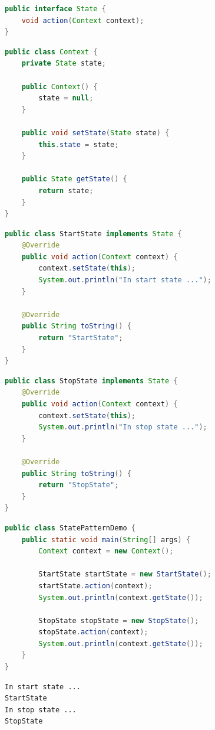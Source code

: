 \vspace{0.5cm}

\begin{lstlisting}[language=Java, title=State.java]
public interface State {
    void action(Context context);
}
\end{lstlisting}

\begin{lstlisting}[language=Java, title=Context.java]
public class Context {
    private State state;

    public Context() {
        state = null;
    }

    public void setState(State state) {
        this.state = state;
    }

    public State getState() {
        return state;
    }
}
\end{lstlisting}

\begin{lstlisting}[language=Java, title=StartState.java]
public class StartState implements State {
    @Override
    public void action(Context context) {
        context.setState(this);
        System.out.println("In start state ...");
    }

    @Override
    public String toString() {
        return "StartState";
    }
}
\end{lstlisting}

\begin{lstlisting}[language=Java, title=StopState.java]
public class StopState implements State {
    @Override
    public void action(Context context) {
        context.setState(this);
        System.out.println("In stop state ...");
    }

    @Override
    public String toString() {
        return "StopState";
    }
}
\end{lstlisting}

\begin{lstlisting}[language=Java, title=StatePatternDemo.java]
public class StatePatternDemo {
    public static void main(String[] args) {
        Context context = new Context();

        StartState startState = new StartState();
        startState.action(context);
        System.out.println(context.getState());

        StopState stopState = new StopState();
        stopState.action(context);
        System.out.println(context.getState());
    }
}
\end{lstlisting}

\begin{tcolorbox}
    \begin{verbatim}
In start state ...
StartState
In stop state ...
StopState
\end{verbatim}
\end{tcolorbox}

